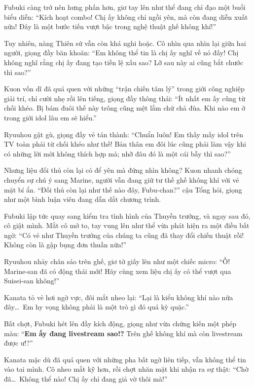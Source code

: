 \documentclass[../main.tex]{subfiles}
\begin{document}
Fubuki càng trở nên hưng phấn hơn, giơ tay lên như thể đang chỉ đạo một buổi biểu diễn: ``Kích hoạt combo! Chị ấy không chỉ ngồi yên, mà còn đang diễn xuất nữa! Đây là một bước tiến vượt bậc trong nghệ thuật ghế không khí!''

Tuy nhiên, nàng Thiên sứ vẫn còn khá nghi hoặc. Cô nhìn qua nhìn lại giữa hai người, giọng đầy băn khoăn: ``Em không thể tin là chị ấy nghĩ về nó đấy! Chị không nghĩ rằng chị ấy đang tạo tiền lệ xấu sao? Lỡ sau này ai cũng bắt chước thì sao?''

Kuon vốn dĩ đã quá quen với những ``trận chiến tâm lý'' trong giới công nghiệp giải trí, chỉ cười nhẹ rồi lên tiếng, giọng đầy thông thái: ``Ít nhất em ấy cũng từ chối khéo. Bị bám đuôi thế này trông cũng mệt lắm chứ chả đùa. Khi nào em ở trong giới idol lâu em sẽ hiểu.''

Ryuuhou gật gù, giọng đầy vẻ tán thành: ``Chuẩn luôn! Em thấy mấy idol trên TV toàn phải từ chối khéo như thế! Bản thân em đôi lúc cũng phải làm vậy khi có những lời mời không thích hợp mà; nhỡ đâu đó là một cái bẫy thì sao?''

Nhưng liệu đối thủ còn lại có để yên mà đứng nhìn không? Kuon nhanh chóng chuyển sự chú ý sang Marine, người vẫn đang giữ tư thế ghế không khí với vẻ mặt bí ẩn. ``Đối thủ còn lại như thế nào đây, Fubu-chan?'' cậu Tổng hỏi, giọng như một bình luận viên đang dẫn dắt chương trình.

Fubuki lập tức quay sang kiểm tra tình hình của Thuyền trưởng, và ngay sau đó, cô giật mình. Mắt cô mở to, tay vung lên như thể vừa phát hiện ra một điều bất ngờ: ``Có vẻ như Thuyền trưởng của chúng ta cũng đã thay đổi chiến thuật rồi! Không còn là gập bụng đơn thuần nữa!''

Ryuuhou nhảy chân sáo trên ghế, giơ tờ giấy lên như một chiếc micro: ``Ồ! Marine-san đã có động thái mới! Hãy cùng xem liệu chị ấy có thể vượt qua Suisei-san không!''

Kanata tỏ vẻ hơi ngờ vực, đôi mắt nheo lại: ``Lại là kiểu không khí nào nữa đây\dots\ Em hy vọng không phải là một trò gì đó quá kỳ quặc.''

Bất chợt, Fubuki hét lên đầy kích động, giọng như vừa chứng kiến một phép màu: ``\textbf{Em ấy đang livestream sao!?} Trên ghế không khí mà còn livestream được ư!?''


Kanata mặc dù đã quá quen với những pha bất ngờ liên tiếp, vẫn không thể tin vào tai mình. Cô nheo mắt kỹ hơn, rồi chợt nhăn mặt khi nhận ra sự thật: ``Chờ đã\dots\ Không thể nào! Chị ấy chỉ đang giả vờ thôi mà!''
\end{document}
